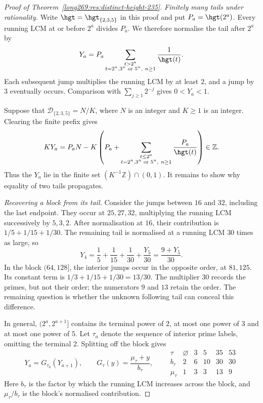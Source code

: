 \begin{proof}[Proof of Theorem~\ref{long269:res:distinct-height-235}]
\emph{Finitely many tails under rationality.}
Write $\hgt=\hgt_{\{2,3,5\}}$ in this proof and put $P_a=\hgt(2^a)$.
Every running LCM at or before $2^a$ divides $P_a$. We therefore normalise
the tail after $2^a$ by
\begin{equation}\label{long269:eq:five-tail}
 Y_a=P_a\sum_{\substack{t>2^a\\t=2^n,3^n\text{ or }5^n,\ n\ge1}}
                   \frac1{\hgt(t)}.
\end{equation}
Each subsequent jump multiplies the running LCM by at least $2$, and a jump
by $3$ eventually occurs. Comparison with $\sum_{j\ge1}2^{-j}$ gives
$0<Y_a<1$.

Suppose that $\mathcal D_{\{2,3,5\}}=N/K$, where $N$ is an integer and
$K\ge1$ is an integer. Clearing the finite prefix gives
\[
 KY_a=P_aN-K\left(P_a+
        \sum_{\substack{t\le2^a\\t=2^n,3^n\text{ or }5^n,\ n\ge1}}
                 \frac{P_a}{\hgt(t)}\right)\in\mathbb Z.
\]
Thus the $Y_a$ lie in the finite set $(K^{-1}\mathbb Z)\cap(0,1)$.
It remains to show why equality of two tails propagates.

\medskip
\emph{Recovering a block from its tail.}
Consider the jumps between $16$ and $32$, including the last endpoint.
They occur at $25,27,32$, multiplying the running LCM successively by $5,3,2$.
After normalisation at $16$, their contribution is
$1/5+1/15+1/30$. The remaining tail is normalised at a running LCM $30$
times as large, so
\[
 Y_4=\frac15+\frac1{15}+\frac1{30}+\frac{Y_5}{30}
     =\frac{9+Y_5}{30}.
\]
In the block $(64,128]$, the interior jumps occur in the opposite order,
at $81,125$. Its constant term is $1/3+1/15+1/30=13/30$.
The multiplier $30$ records the primes, but not their order; the
numerators $9$ and $13$ retain the order. The remaining question is
whether the unknown following tail can conceal this difference.

In general, $(2^a,2^{a+1}]$ contains its terminal power of $2$, at most
one power of $3$ and at most one power of $5$. Let $\tau_a$ denote the
sequence of interior prime labels, omitting the terminal $2$. Splitting
off the block gives
\begin{equation}\label{long269:eq:five-maps}
 Y_a=G_{\tau_a}(Y_{a+1}),\qquad
 G_\tau(y)=\frac{\mu_\tau+y}{b_\tau},\qquad
 \begin{array}{c|ccccc}
 \tau&\varnothing&3&5&35&53\\\hline
 b_\tau&2&6&10&30&30\\
 \mu_\tau&1&3&3&13&9
 \end{array}
\end{equation}
Here $b_\tau$ is the factor by which the running LCM increases across the
block, and $\mu_\tau/b_\tau$ is the block's normalised contribution.


\end{proof}

